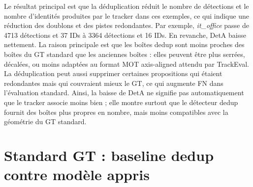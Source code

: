 \documentclass[11pt,a4paper]{article}
\begin{document}
Le résultat principal est que la déduplication réduit le nombre de détections et le nombre d'identités produites par le tracker dans ces exemples, ce qui indique une réduction des doublons et des pistes redondantes. Par exemple, \textit{it\_office} passe de 4713 détections et 37 IDs à 3364 détections et 16 IDs. En revanche, DetA baisse nettement. La raison principale est que les boîtes dedup sont moins proches des boîtes du GT standard que les anciennes boîtes : elles peuvent être plus serrées, décalées, ou moins adaptées au format MOT axis-aligned attendu par TrackEval. La déduplication peut aussi supprimer certaines propositions qui étaient redondantes mais qui couvraient mieux le GT, ce qui augmente FN dans l'évaluation standard. Ainsi, la baisse de DetA ne signifie pas automatiquement que le tracker associe moins bien ; elle montre surtout que le détecteur dedup fournit des boîtes plus propres en nombre, mais moins compatibles avec la géométrie du GT standard.

\begin{table}[H]
\centering
{}
\caption{Exemples de comparaison détection-only entre l'ancienne détection et la détection dedup. Les scores viennent de TrackEval standard GT, mais seuls les compteurs de détection sont analysés.}
\end{table}

\section{Standard GT : baseline dedup contre modèle appris}
\end{document}
